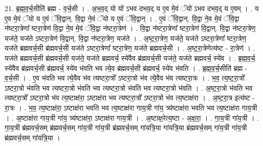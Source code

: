 \documentclass[17pt]{extarticle}
\begin{document}
21. ब्र॒ह्म॒व॒र्च॒सीति॑ ब्रह्म - व॒र्च॒सी । . अ॒भ॒व॒द् यो यो॑ ऽभव दभव॒द् य ए॒व मे॒वं ॅयो॑ ऽभव दभव॒द् य ए॒वम् । . य ए॒व मे॒वं ॅयो य ए॒वं ॅवि॒द्वान्. वि॒द्वा ने॒वं ॅयो य ए॒वं ॅवि॒द्वान् । . ए॒वं ॅवि॒द्वान्. वि॒द्वा ने॒व मे॒वं ॅवि॒द्वा न॑ष्टरा॒त्रेणा᳚ ष्टरा॒त्रेण॑ वि॒द्वा ने॒व मे॒वं ॅवि॒द्वा न॑ष्टरा॒त्रेण॑ । . वि॒द्वा न॑ष्टरा॒त्रेणा᳚ ष्टरा॒त्रेण॑ वि॒द्वान्. वि॒द्वा न॑ष्टरा॒त्रेण॒ यज॑ते॒ यज॑ते ऽष्टरा॒त्रेण॑ वि॒द्वान्. वि॒द्वा न॑ष्टरा॒त्रेण॒ यज॑ते । . अ॒ष्ट॒रा॒त्रेण॒ यज॑ते॒ यज॑ते ऽष्टरा॒त्रेणा᳚ ष्टरा॒त्रेण॒ यज॑ते ब्रह्मवर्च॒सी ब्र॑ह्मवर्च॒सी यज॑ते ऽष्टरा॒त्रेणा᳚ ष्टरा॒त्रेण॒ यज॑ते ब्रह्मवर्च॒सी । . अ॒ष्ट॒रा॒त्रेणेत्य॑ष्ट - रा॒त्रेण॑ । . यज॑ते ब्रह्मवर्च॒सी ब्र॑ह्मवर्च॒सी यज॑ते॒ यज॑ते ब्रह्मवर्च॒ स्ये॑वैव ब्र॑ह्मवर्च॒सी यज॑ते॒ यज॑ते ब्रह्मवर्च॒ स्ये॑व । . ब्र॒ह्म॒व॒र्च॒ स्ये॑वैव ब्र॑ह्मवर्च॒सी ब्र॑ह्मवर्च॒ स्ये॑व भ॑वति भव त्ये॒व ब्र॑ह्मवर्च॒सी ब्र॑ह्मवर्च॒ स्ये॑व भ॑वति । . ब्र॒ह्म॒व॒र्च॒सीति॑ ब्रह्म - व॒र्च॒सी । . ए॒व भ॑वति भव त्ये॒वैव भ॑व त्यष्टरा॒त्रो᳚ ऽष्टरा॒त्रो भ॑व त्ये॒वैव भ॑व त्यष्टरा॒त्रः । . भ॒व॒ त्य॒ष्ट॒रा॒त्रो᳚ ऽष्टरा॒त्रो भ॑वति भव त्यष्टरा॒त्रो भ॑वति भव त्यष्टरा॒त्रो भ॑वति भव त्यष्टरा॒त्रो भ॑वति । . अ॒ष्ट॒रा॒त्रो भ॑वति भव त्यष्टरा॒त्रो᳚ ऽष्टरा॒त्रो भ॑व त्य॒ष्टाक्ष॑रा॒ ऽष्टाक्ष॑रा भव त्यष्टरा॒त्रो᳚ ऽष्टरा॒त्रो भ॑व त्य॒ष्टाक्ष॑रा । . अ॒ष्ट॒रा॒त्र इत्य॑ष्ट - रा॒त्रः । . भ॒व॒ त्य॒ष्टाक्ष॑रा॒ ऽष्टाक्ष॑रा भवति भव त्य॒ष्टाक्ष॑रा गाय॒त्री गा॑य॒ त्र्य॑ष्टाक्ष॑रा भवति भव त्य॒ष्टाक्ष॑रा गाय॒त्री । . अ॒ष्टाक्ष॑रा गाय॒त्री गा॑य॒ त्र्य॑ष्टाक्ष॑रा॒ ऽष्टाक्ष॑रा गाय॒त्री । . अ॒ष्टाक्ष॒रेत्य॒ष्टा - अ॒क्ष॒रा॒ । . गा॒य॒त्री गा॑य॒त्री । . गा॒य॒त्री ब्र॑ह्मवर्च॒सम् ब्र॑ह्मवर्च॒सम् गा॑य॒त्री गा॑य॒त्री ब्र॑ह्मवर्च॒सम् गा॑यत्रि॒या गा॑यत्रि॒या ब्र॑ह्मवर्च॒सम् गा॑य॒त्री गा॑य॒त्री ब्र॑ह्मवर्च॒सम् गा॑यत्रि॒या । \newline
\end{document}
